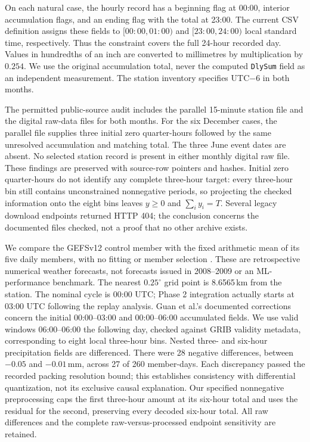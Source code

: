 \documentclass[12pt]{article}
\begin{document}
On each natural case, the hourly record has a beginning flag at 00:00,
interior accumulation flags, and an ending flag with the total at 23:00.
The current CSV definition assigns these fields to $[00{:}00,01{:}00)$ and
$[23{:}00,24{:}00)$ local standard time, respectively. Thus the constraint
covers the full 24-hour recorded day. Values in hundredths of an inch are
converted to millimetres by multiplication by $0.254$. We use the original
accumulation total, never the computed \texttt{DlySum} field as an independent
measurement. The station inventory specifies UTC$-6$ in both months.

The permitted public-source audit includes the parallel 15-minute station
file and the digital raw-data files for both months. For the six December
cases, the parallel file supplies three initial zero quarter-hours followed
by the same unresolved accumulation and matching total. The three June
event dates are absent. No selected station record is present in either
monthly digital raw file. These findings are preserved with source-row
pointers and hashes. Initial zero quarter-hours do not identify any complete
three-hour target: every three-hour bin still contains unconstrained
nonnegative periods, so projecting the checked information onto the eight
bins leaves $y\geq0$ and $\sum_i y_i=T$. Several legacy download endpoints
returned HTTP 404; the conclusion concerns the documented files checked,
not a proof that no other archive exists.

We compare the GEFSv12 control member with the fixed arithmetic mean of its
five daily members, with no fitting or member selection
\cite{guan2022gefs,noaa_gefs_archive}. These are retrospective numerical
weather forecasts, not forecasts issued in 2008--2009 or an ML-performance
benchmark. The nearest $0.25^{\circ}$ grid point is 8.6565\,km from the station.
The nominal cycle is 00:00 UTC; Phase 2 integration actually starts at 03:00
UTC following the replay analysis. Guan et al.'s documented corrections
concern the initial 00:00--03:00 and 00:00--06:00 accumulated fields. We use
valid windows 06:00--06:00 the following day, checked against GRIB validity
metadata, corresponding to eight local three-hour bins. Nested three- and
six-hour precipitation fields are differenced. There were 28 negative
differences, between $-0.05$ and $-0.01$\,mm,
across 27 of 260 member-days. Each discrepancy passed the recorded packing
resolution bound; this establishes consistency with differential quantization,
not its exclusive causal explanation. Our specified nonnegative preprocessing caps the first
three-hour amount at its six-hour total and uses the residual for the second,
preserving every decoded six-hour total. All raw differences and the complete
raw-versus-processed endpoint sensitivity are retained.
\end{document}
